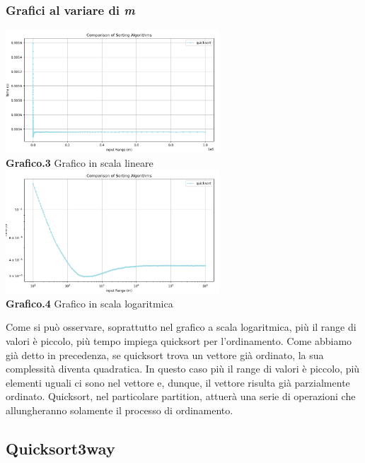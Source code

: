\documentclass{article}
\begin{document}
        \subsubsection{Grafici al variare di \textit{m}}
            \begin{center}
                \includegraphics[width=0.6\textwidth]{Quicksort_InputRange.png} \\
                \textbf{Grafico.3} Grafico in scala lineare\\
                \vspace{0.5cm}
                \includegraphics[width=0.6\textwidth]{Quicksort_InputRange_Log.png} \\
                \textbf{Grafico.4} Grafico in scala logaritmica\\
            \end{center}
            Come si può osservare, soprattutto nel grafico a scala logaritmica, più il range di valori è piccolo, più tempo impiega quicksort per l'ordinamento. Come abbiamo già detto in precedenza, se quicksort trova un vettore già ordinato, la sua complessità diventa quadratica. In questo caso più il range di valori è piccolo, più elementi uguali ci sono nel vettore e, dunque, il vettore risulta già parzialmente ordinato. Quicksort, nel particolare partition, attuerà una serie di operazioni che allungheranno solamente il processo di ordinamento.

    \subsection{Quicksort3way}
\end{document}
